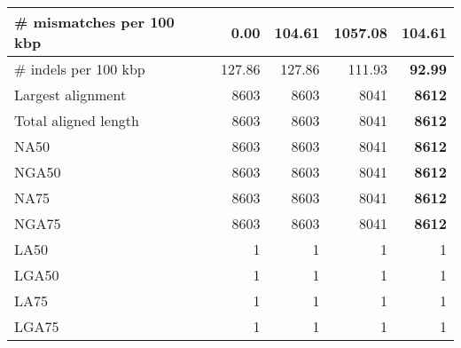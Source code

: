 \documentclass[12pt,a4paper]{article}
\begin{document}
\begin{table}[ht]
\begin{center}
\begin{tabular}{|l*{4}{|r}|}
\# mismatches per 100 kbp & {\bf 0.00} & 104.61 & 1057.08 & 104.61 \\ \hline
\# indels per 100 kbp & 127.86 & 127.86 & 111.93 & {\bf 92.99} \\ \hline
Largest alignment & 8603 & 8603 & 8041 & {\bf 8612} \\ \hline
Total aligned length & 8603 & 8603 & 8041 & {\bf 8612} \\ \hline
NA50 & 8603 & 8603 & 8041 & {\bf 8612} \\ \hline
NGA50 & 8603 & 8603 & 8041 & {\bf 8612} \\ \hline
NA75 & 8603 & 8603 & 8041 & {\bf 8612} \\ \hline
NGA75 & 8603 & 8603 & 8041 & {\bf 8612} \\ \hline
LA50 & 1 & 1 & 1 & 1 \\ \hline
LGA50 & 1 & 1 & 1 & 1 \\ \hline
LA75 & 1 & 1 & 1 & 1 \\ \hline
LGA75 & 1 & 1 & 1 & 1 \\ \hline
\end{tabular}
\end{center}
\end{table}
\end{document}
